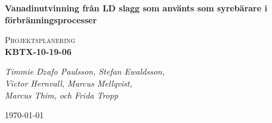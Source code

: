
\begin{titlepage}
\begin{centering}

{\huge\bfseries Vanadinutvinning från LD slagg som använts som syrebärare i förbränningsprocesser \par}
\vspace{1cm}
{\scshape\Large Projektsplanering \\ \textbf{KBTX-10-19-06}\par}
{\scshape\Large \par}
{\Large\itshape Timmie D$\check{z}$afo Paulsson, Stefan Ewaldsson, \\ Victor Hernvall, Marcus Mellqvist, \\ Marcus Thim, och Frida Tropp\par}
{\large \today\par}
{   \par}
{   \par}
{    \par}





\end{centering}
\end{titlepage}


\begin{centering}
\end{centering}
\newpage
\thispagestyle{empty}
\thispagestyle{empty}
\tableofcontents
\thispagestyle{empty}
\newpage
{}
